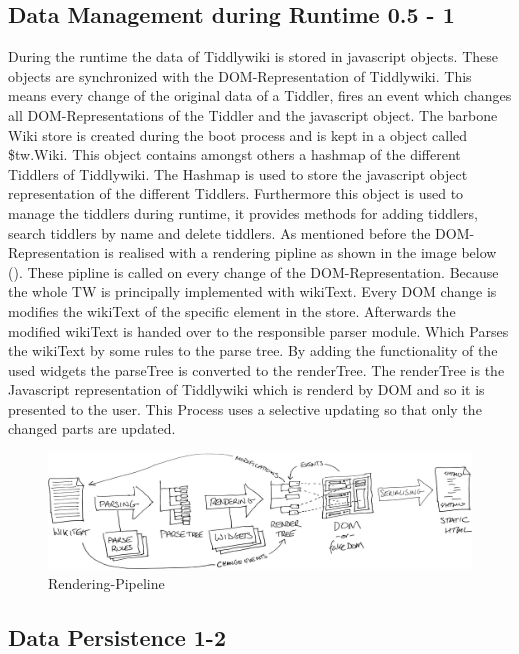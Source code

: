 \documentclass[12pt,a4paper]{article}
\begin{document}
\subsection{Data Management during Runtime 0.5 - 1}
During the runtime the data of Tiddlywiki is stored in javascript objects. These objects are synchronized with the DOM-Representation of Tiddlywiki. This means every change of the original data of a Tiddler, fires an event which changes all DOM-Representations of the Tiddler and the javascript object. The barbone Wiki store is created during the boot process and is kept in a object called \$tw.Wiki. This object contains amongst others a hashmap of the different Tiddlers of Tiddlywiki. The Hashmap is used to store the javascript object representation of the different Tiddlers. Furthermore this object is used to manage the tiddlers during runtime, it provides methods for adding tiddlers, search tiddlers by name and delete tiddlers. As mentioned before the DOM-Representation is realised with a rendering pipline as shown in the image below (). These pipline is called on every change of the DOM-Representation. Because the whole TW is principally implemented with wikiText. Every DOM change is modifies the wikiText of the specific element in the store.  Afterwards the modified wikiText is handed over to the responsible parser module. Which Parses the wikiText by some rules to the parse tree. By adding the functionality of the used widgets the parseTree is converted to the renderTree. The renderTree is the Javascript representation of Tiddlywiki which is renderd by DOM and so it is presented to the user. This Process uses a selective updating so that only the changed parts are updated.
\begin{figure}[hbtp]
\caption{Rendering-Pipeline\protect\cite{TIDD:ARCH}}
\label{fig:rendering}
\includegraphics[scale=0.075]{images/TiddlyWikiArchitecture.png}
\end{figure}

\newpage
\subsection{Data Persistence 1-2}
\end{document}
